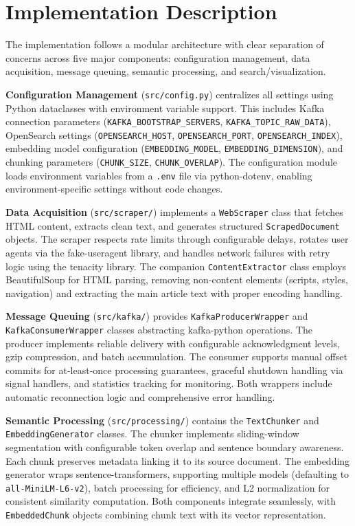 \documentclass[12pt, a4paper]{article}
\begin{document}
\newpage
\section{Implementation Description}

The implementation follows a modular architecture with clear separation of concerns across five major components: configuration management, data acquisition, message queuing, semantic processing, and search/visualization.

\textbf{Configuration Management} (\texttt{src/config.py}) centralizes all settings using Python dataclasses with environment variable support. This includes Kafka connection parameters (\texttt{KAFKA\_BOOTSTRAP\_SERVERS}, \texttt{KAFKA\_TOPIC\_RAW\_DATA}), OpenSearch settings (\texttt{OPENSEARCH\_HOST}, \texttt{OPENSEARCH\_PORT}, \texttt{OPENSEARCH\_INDEX}), embedding model configuration (\texttt{EMBEDDING\_MODEL}, \texttt{EMBEDDING\_DIMENSION}), and chunking parameters (\texttt{CHUNK\_SIZE}, \texttt{CHUNK\_OVERLAP}). The configuration module loads environment variables from a \texttt{.env} file via python-dotenv, enabling environment-specific settings without code changes.

\textbf{Data Acquisition} (\texttt{src/scraper/}) implements a \texttt{WebScraper} class that fetches HTML content, extracts clean text, and generates structured \texttt{ScrapedDocument} objects. The scraper respects rate limits through configurable delays, rotates user agents via the fake-useragent library, and handles network failures with retry logic using the tenacity library. The companion \texttt{ContentExtractor} class employs BeautifulSoup for HTML parsing, removing non-content elements (scripts, styles, navigation) and extracting the main article text with proper encoding handling.

\textbf{Message Queuing} (\texttt{src/kafka/}) provides \texttt{KafkaProducerWrapper} and \texttt{KafkaConsumerWrapper} classes abstracting kafka-python operations. The producer implements reliable delivery with configurable acknowledgment levels, gzip compression, and batch accumulation. The consumer supports manual offset commits for at-least-once processing guarantees, graceful shutdown handling via signal handlers, and statistics tracking for monitoring. Both wrappers include automatic reconnection logic and comprehensive error handling.

\textbf{Semantic Processing} (\texttt{src/processing/}) contains the \texttt{TextChunker} and \texttt{EmbeddingGenerator} classes. The chunker implements sliding-window segmentation with configurable token overlap and sentence boundary awareness. Each chunk preserves metadata linking it to its source document. The embedding generator wraps sentence-transformers, supporting multiple models (defaulting to \texttt{all-MiniLM-L6-v2}), batch processing for efficiency, and L2 normalization for consistent similarity computation. Both components integrate seamlessly, with \texttt{EmbeddedChunk} objects combining chunk text with its vector representation.
\end{document}
